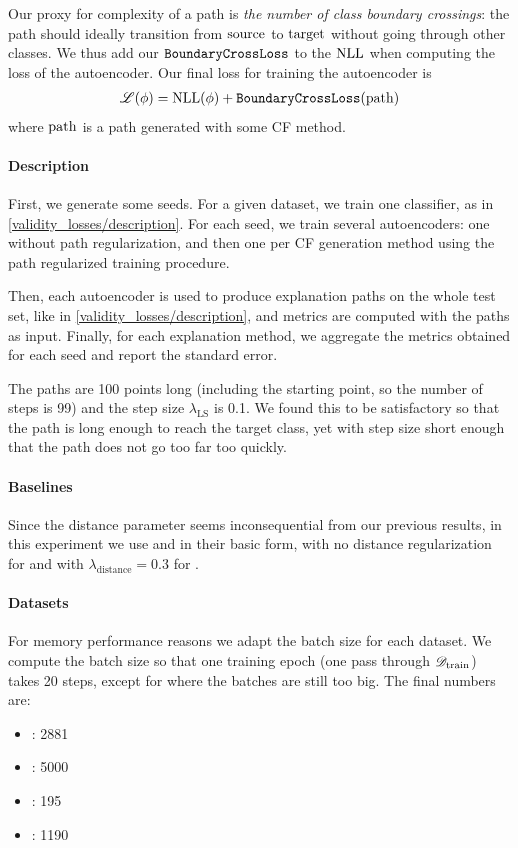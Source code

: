 \documentclass[../main.tex]{subfiles}
\begin{document}
Our proxy for complexity of a path is \emph{the number of class boundary crossings}:
the path should ideally transition from $\mathrm{source}$ to $\mathrm{target}$ without going through other classes.
We thus add our $\mathtt{BoundaryCrossLoss}$ to the $\text{NLL}$ when computing the loss of the autoencoder.
Our final loss for training the autoencoder is
\begin{align*}
    \mathscr{L}(\phi) = \text{NLL}(\phi) + \mathtt{BoundaryCrossLoss}(\mathrm{path})
\end{align*}
where $\mathrm{path}$ is a path generated with some CF method.


\paragraph{Description}

First, we generate some seeds.
For a given dataset, we train one classifier, as in \autoref{validity_losses/description}.
For each seed, we train several autoencoders: one without path regularization, and then one per CF generation method using the path regularized training procedure.

Then, each autoencoder is used to produce explanation paths on the whole test set, like in \autoref{validity_losses/description}, and metrics are computed with the paths as input.
Finally, for each explanation method, we aggregate the metrics obtained for each seed and report the standard error.

The paths are 100 points long (including the starting point, so the number of steps is 99) and the step size $\lambda_\text{LS}$ is 0.1. We found this to be satisfactory so that the path is long enough to reach the target class, yet with step size short enough that the path does not go too far too quickly.

\paragraph{Baselines}
\label{exp/path_reg/baselines}

Since the distance parameter seems inconsequential from our previous results,
in this experiment we use \ls{} and \revise{} in their basic form, \ie{} with no distance regularization for \ls{} and with $\lambda_\text{distance} = 0.3$ for \revise.

\paragraph{Datasets}

For memory performance reasons we adapt the batch size for each dataset.
We compute the batch size so that one training epoch (one pass through $\mathscr{D}_\text{train}$) takes 20 steps, except for \ForestCover{} where the batches are still too big.
The final numbers are:
\begin{itemize}
    \item \CakeOnSea: 2881
    \item \ForestCover: 5000
    \item \WineQuality: 195
    \item \OnlineNewsPopularity: 1190
\end{itemize}
\end{document}
